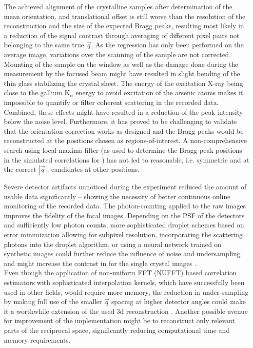 The achieved alignment of the crystalline samples after determination of the mean orientation, and translational offset is still worse than the resolution of the reconstruction and the size of the expected Bragg peaks, resulting most likely in a reduction of the signal contrast through averaging of different pixel pairs not belonging to the same true $\vec{q}$. As the regression has only been performed on the average image, variations over the scanning of the sample are not corrected. Mounting of the sample on the window as well as the damage done during the measurement by the focused beam might have resulted in slight bending of the thin glass stabilizing the crystal sheet. The energy of the excitation X-ray being close to the gallium K$_\alpha$ energy to avoid excitation of the arsenic atoms makes it impossible to quantify or filter coherent scattering in the recorded data. Combined, these effects might have resulted in a reduction of the peak intensity below the noise level. Furthermore, it has proved to be challenging to validate that the orientation correction works as designed and the Bragg peaks would be reconstructed at the positions chosen as regions-of-interest. A non-comprehensive search using local maxima filter (as used to determine the Bragg peak positions in the simulated correlations for ) has not led to reasonable, i.e. symmetric and at the correct $\left|\vec{q}\right|$, candidates at other positions.

Severe detector artifacts unnoticed during the experiment reduced the amount of usable data significantly -- showing the necessity of better continuous online monitoring of the recorded data. The photon-counting applied to the raw images improves the fidelity of the focal images. Depending on the PSF of the detectors and sufficiently low photon counts, more sophisticated droplet schemes based on error minimization allowing for subpixel resolution, incorporating the scattering photons into the droplet algorithm, or using a neural network trained on synthetic images could further reduce the influence of noise and undersampling and might increase the contrast in for the single crystal images \cite{baumann2018,collaboration2014,schayck2020,sun2020}.\\
Even though the application of non-uniform FFT (NUFFT) based correlation estimators with sophisticated interpolation kernels, which have successfully been used in other fields, would require more memory, the reduction in under-sampling by making full use of the smaller $\vec{q}$ spacing at higher detector angles could make it a worthwhile extension of the used 3d reconstruction \cite{laguna1998,yang2008,chang2020}. Another possible avenue for improvement of the implementation might be to reconstruct only relevant parts of the reciprocal space, significantly reducing computational time and memory requirements. 

